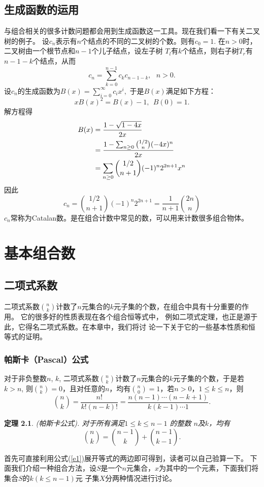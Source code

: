 \documentclass[a4paper,11pt,twoside]{book}
\newtheorem{thm}{定理}[section]
\begin{document}
\section{生成函数的运用}
与组合相关的很多计数问题都会用到生成函数这一工具。现在我们看一下有关二叉树的例子。
设$c_n$表示有$n$个结点的不同的二叉树的个数。则有$c_0=1.$ 在$n>0$时，二叉树由一个根节点和$n-1$个儿子结点，设左子树
$T_l$有$k$个结点，则右子树$T_r$有$n-1-k$个结点，从而
$$c_n=\sum_{k=0}^{n-1}c_kc_{n-1-k},\ \ \ n>0.$$
设$c_n$的生成函数为$B(x)=\sum_{i=0}^{\infty}c_ix^i,$ 于是$B(x)$满足如下方程：
$$xB(x)^2=B(x)-1,\ \ B(0)=1.$$
解方程得
\begin{align}
B(x)&=\frac{1-\sqrt{1-4x}}{2x}\notag\\
&=\frac{1-\sum_{n\geq 0}{1/2\choose n}(-4x)^n}{2x}\notag\\
&=\sum_{n\geq 0}{1/2\choose n+1}(-1)^n2^{2n+1}x^n\notag
\end{align}
因此
$$c_n={1/2\choose n+1}(-1)^n2^{2n+1}=\frac{1}{n+1}{2n\choose n}$$
$c_n$常称为Catalan数。是在组合计数中常见的数，可以用来计数很多组合物体。



\chapter{基本组合数}
\label{zuhejiegou} \minitoc



\section{二项式系数}

二项式系数${n \choose
k}$计数了$n$元集合的$k$元子集的个数，在组合中具有十分重要的作用。
它的很多好的性质表现在各个组合恒等式中，
例如二项式定理，也正是源于此，它得名二项式系数。在本章中，我们将讨
论一下关于它的一些基本性质和恒等式的证明。

\subsection{帕斯卡（Pascal）公式}
对于非负整数$n$, $k$, 二项式系数${n \choose
k}$计数了$n$元集合的$k$元子集的个数，于是若 $k>n$, 则${n \choose
k}=0$，且对任意的$n$，均有${n \choose 0}=1$，若$n>0$，$1\leq k \leq
n$，则
\begin{equation}\label{e1}
{n \choose k}=\frac{n!}{k!(n-k)!}=\frac{n(n-1)\cdots
(n-k+1)}{k(k-1)\cdots 1}.
\end{equation}
\begin{thm}
(帕斯卡公式). 对于所有满足$1\leq k\leq n-1$ 的整数 $n$及$k$，均有
\begin{equation}\label{e2}
{n\choose k}={n-1 \choose k}+{n-1\choose k-1}.
\end{equation}
\end{thm}
首先可直接利用公式(\ref{e1})展开等式的两边即可得到，读者可以自己验算一下。
下面我们介绍一种组合方法，设$S$是一个$n$元集合，$x$为其中的一个元素，下面我们将集合$S$的$k(k\leq
n-1)$元 子集$X$分两种情况进行讨论。
\end{document}

